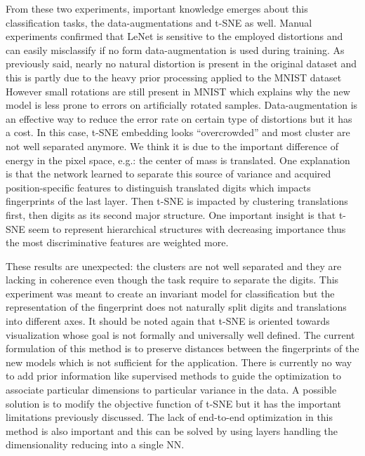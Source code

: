 \documentclass[a4paper,12pt]{report}
\newcommand{\eg}{e.g.}
\begin{document}
From these two experiments, important knowledge emerges about this classification tasks, the data-augmentations and t-SNE as well.
Manual experiments confirmed that LeNet is sensitive to the employed distortions and can easily misclassify if no form data-augmentation is used during training.
As previously said, nearly no natural distortion is present in the original dataset and this is partly due to the heavy prior processing applied to the MNIST dataset
However small rotations are still present in MNIST which explains why the new model is less prone to errors on artificially rotated samples.
Data-augmentation is an effective way to reduce the error rate on certain type of distortions but it has a cost.
In this case, t-SNE embedding looks ``overcrowded'' and most cluster are not well separated anymore.
We think it is due to the important difference of energy in the pixel space, \eg: the center of mass is translated.
One explanation is that the network learned to separate this source of variance and acquired position-specific features to distinguish translated digits which impacts fingerprints of the last layer.
Then t-SNE is impacted by clustering translations first, then digits as its second major structure.
One important insight is that t-SNE seem to represent hierarchical structures with decreasing importance thus the most discriminative features are weighted more.

These results are unexpected: the clusters are not well separated and they are lacking in coherence even though the task require to separate the digits.
This experiment was meant to create an invariant model for classification but the representation of the fingerprint does not naturally split digits and translations into different axes.
It should be noted again that t-SNE is oriented towards visualization whose goal is not formally and universally well defined.
The current formulation of this method is to preserve distances between the fingerprints of the new models which is not sufficient for the application.
There is currently no way to add prior information like supervised methods to guide the optimization to associate particular dimensions to particular variance in the data.
A possible solution is to modify the objective function of t-SNE but it has the important limitations previously discussed.
The lack of end-to-end optimization in this method is also important and this can be solved by using layers handling the dimensionality reducing into a single NN.
\end{document}
